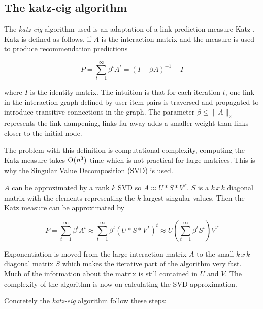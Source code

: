 \subsection{The katz-eig algorithm}\label{sec:background:katzeig}

The \textit{katz-eig} algorithm used is an adaptation \citep{shin2012multi} of a link prediction measure Katz \citep{katz1953new}. Katz is defined as follows, if $A$ is the interaction matrix and the measure is used to produce recommendation predictions

\begin{equation}
    P = \sum_{t=1}^{\infty} \beta^t A^t = (I - \beta A)^{-1} - I
\end{equation}

where $I$ is the identity matrix. The intuition is that for each iteration $t$, one link in the interaction graph defined by user-item pairs is traversed and propagated to introduce transitive connections in the graph. The parameter $\beta \leq \| A \|_2$ represents the link dampening, links far away adds a smaller weight than links closer to the initial node.

The problem with this definition is computational complexity, computing the Katz measure takes $\operatorname{O}\bigl(n^3\bigr)$ time which is not practical for large matrices. This is why the Singular Value Decomposition (SVD) is used.

$A$ can be approximated by a rank $k$ SVD so $A \approx U * S * V^T$. $S$ is a $k\,x\,k$ diagonal matrix with the elements representing the $k$ largest singular values. Then the Katz measure can be approximated by

\begin{equation}
    P = \sum_{t=1}^{\infty} \beta^t A^t
    \approx \sum_{t=1}^{\infty} \beta^t (U * S * V^T)^t
    \approx U \left( \sum_{t=1}^{\infty} \beta^t S^t \right) V^T
\end{equation}

Exponentiation is moved from the large interaction matrix $A$ to the small $k\,x\,k$ diagonal matrix $S$ which makes the iterative part of the algorithm very fast. Much of the information about the matrix is still contained in $U$ and $V$. The complexity of the algorithm is now on calculating the SVD approximation.

\newpage
Concretely the \textit{katz-eig} algorithm follow these steps:

